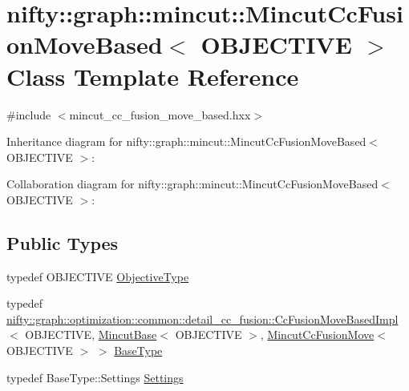 \hypertarget{classnifty_1_1graph_1_1mincut_1_1MincutCcFusionMoveBased}{}\section{nifty\+:\+:graph\+:\+:mincut\+:\+:Mincut\+Cc\+Fusion\+Move\+Based$<$ O\+B\+J\+E\+C\+T\+I\+V\+E $>$ Class Template Reference}
\label{classnifty_1_1graph_1_1mincut_1_1MincutCcFusionMoveBased}


{\ttfamily \#include $<$mincut\+\_\+cc\+\_\+fusion\+\_\+move\+\_\+based.\+hxx$>$}



Inheritance diagram for nifty\+:\+:graph\+:\+:mincut\+:\+:Mincut\+Cc\+Fusion\+Move\+Based$<$ O\+B\+J\+E\+C\+T\+I\+V\+E $>$\+:


Collaboration diagram for nifty\+:\+:graph\+:\+:mincut\+:\+:Mincut\+Cc\+Fusion\+Move\+Based$<$ O\+B\+J\+E\+C\+T\+I\+V\+E $>$\+:
\subsection*{Public Types}
\begin{DoxyCompactItemize}
\item 
typedef O\+B\+J\+E\+C\+T\+I\+V\+E \hyperlink{classnifty_1_1graph_1_1mincut_1_1MincutCcFusionMoveBased_accca10038e8674247dcfc5c299eba4b6}{Objective\+Type}
\item 
typedef \hyperlink{classnifty_1_1graph_1_1optimization_1_1common_1_1detail__cc__fusion_1_1CcFusionMoveBasedImpl}{nifty\+::graph\+::optimization\+::common\+::detail\+\_\+cc\+\_\+fusion\+::\+Cc\+Fusion\+Move\+Based\+Impl}$<$ O\+B\+J\+E\+C\+T\+I\+V\+E, \hyperlink{classnifty_1_1graph_1_1MincutBase}{Mincut\+Base}$<$ O\+B\+J\+E\+C\+T\+I\+V\+E $>$, \hyperlink{classnifty_1_1graph_1_1mincut_1_1MincutCcFusionMove}{Mincut\+Cc\+Fusion\+Move}$<$ O\+B\+J\+E\+C\+T\+I\+V\+E $>$ $>$ \hyperlink{classnifty_1_1graph_1_1mincut_1_1MincutCcFusionMoveBased_a59d5e184fa226773ca46fe4d3329ed52}{Base\+Type}
\item 
typedef Base\+Type\+::\+Settings \hyperlink{classnifty_1_1graph_1_1mincut_1_1MincutCcFusionMoveBased_ae4ba68d8a88d0927e8e9362fa0a68e63}{Settings}
\end{DoxyCompactItemize}
